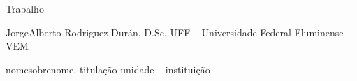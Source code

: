 \documentclass{EEIMVR}
\begin{document}

      {Trabalho}


		   {Jorge}{Alberto Rodriguez Durán, D.Sc.} %
           {UFF -- Universidade Federal Fluminense -- VEM} %


           {nome}{sobrenome, titulação}  %
           {unidade -- instituição} %



\end{document}
